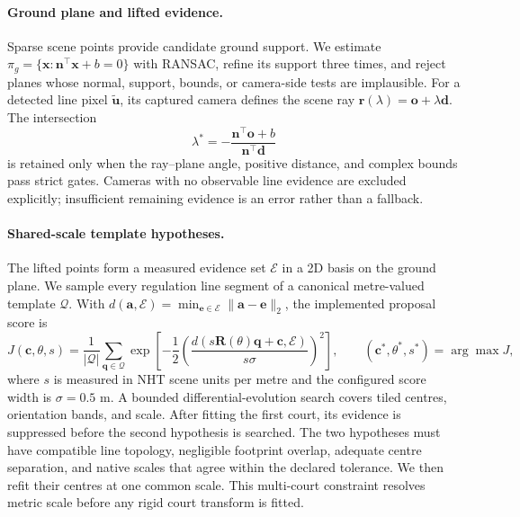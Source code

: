 \paragraph{Ground plane and lifted evidence.}
Sparse scene points provide candidate ground support.  We estimate
\(
  \pi_g=\{\mathbf{x}:\mathbf{n}^{\top}\mathbf{x}+b=0\}
\)
with RANSAC, refine its support three times, and reject planes whose normal,
support, bounds, or camera-side tests are implausible.  For a detected line
pixel \(\tilde{\mathbf{u}}\), its captured camera defines the scene ray
\(
  \mathbf{r}(\lambda)=\mathbf{o}+\lambda\mathbf{d}
\).
The intersection
\begin{equation}
  \lambda^*=-\frac{\mathbf{n}^{\top}\mathbf{o}+b}
                    {\mathbf{n}^{\top}\mathbf{d}}
  \label{eq:ray_plane}
\end{equation}
is retained only when the ray--plane angle, positive distance, and complex
bounds pass strict gates.  Cameras with no observable line evidence are
excluded explicitly; insufficient remaining evidence is an error rather than
a fallback.

\paragraph{Shared-scale template hypotheses.}
The lifted points form a measured evidence set \(\mathcal{E}\) in a 2D basis
on the ground plane.  We sample every regulation line segment of a canonical
metre-valued template \(\mathcal{Q}\).  With
\(d(\mathbf{a},\mathcal{E})=\min_{\mathbf{e}\in\mathcal{E}}
\|\mathbf{a}-\mathbf{e}\|_2\), the implemented proposal score is
\begin{equation}
  J(\mathbf{c},\theta,s)=\frac{1}{|\mathcal{Q}|}
  \sum_{\mathbf{q}\in\mathcal{Q}}
  \exp\!\left[-\frac{1}{2}
    \left(\frac{d(s\mathbf{R}(\theta)\mathbf{q}+\mathbf{c},\mathcal{E})}
                    {s\sigma}\right)^2\right],
  \qquad
  (\mathbf{c}^*,\theta^*,s^*)=\arg\max J,
  \label{eq:template_fit}
\end{equation}
where \(s\) is measured in NHT scene units per metre and the configured score
width is \(\sigma=0.5\) m.  A bounded differential-evolution search covers tiled
centres, orientation bands, and scale.  After fitting the first court, its
evidence is suppressed before the second hypothesis is searched.  The two
hypotheses must have compatible line topology, negligible footprint overlap,
adequate centre separation, and native scales that agree within the declared
tolerance.  We then refit their centres at one common scale.  This multi-court
constraint resolves metric scale before any rigid court transform is fitted.

